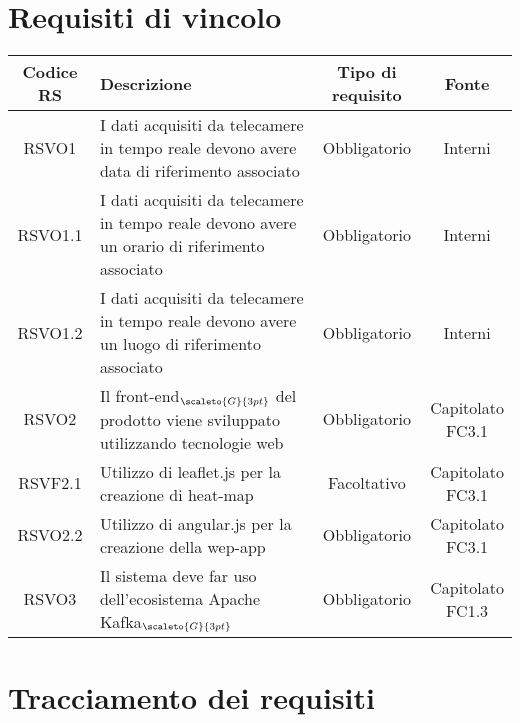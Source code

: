 {\section{Requisiti di vincolo}\label{RequisitiVincolo}

\begin{center}
	\renewcommand{\arraystretch}{1.4}
	\begin{tabularx}{\textwidth}{ |c|X|c|c| }
		\hline
		\rowcolor{Melon}
		\textbf{Codice RS} & \textbf{Descrizione} & \textbf{Tipo di requisito} & \textbf{Fonte} \\
			\hline
		RSVO1  & I dati acquisiti da telecamere in tempo reale devono avere data di riferimento associato  &Obbligatorio & Interni \\
		\hline
		RSVO1.1  & I dati acquisiti da telecamere in tempo reale devono avere un orario di riferimento associato &Obbligatorio & Interni \\
		\hline
		RSVO1.2  & I dati acquisiti da telecamere in tempo reale devono avere un luogo di riferimento associato &Obbligatorio  & Interni \\
		\hline
		RSVO2  & Il front-end$_{\scaleto{G}{3pt}}$ del prodotto viene sviluppato utilizzando tecnologie web &Obbligatorio  & \shortstack{Capitolato\\FC3.1} \\
		\hline
		RSVF2.1  & Utilizzo di leaflet.js per la creazione di heat-map & Facoltativo & \shortstack{Capitolato\\FC3.1} \\
	\hline
		RSVO2.2  & Utilizzo di angular.js per la creazione della wep-app  & Obbligatorio  & \shortstack{Capitolato\\FC3.1} \\
\hline
RSVO3  & Il sistema deve far uso dell'ecosistema Apache Kafka$_{\scaleto{G}{3pt}}$ & Obbligatorio  & \makecell[tcX]{Capitolato\\FC1.3} \\
\hline
	\end{tabularx}
\end{center}

\section{Tracciamento dei requisiti}\label{RequisitiTracciamentoDeiRequisiti}

}
